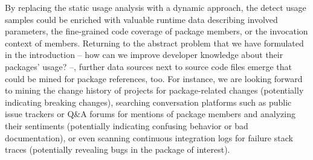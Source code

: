 By replacing the static usage analysis with a dynamic approach, the detect usage samples could be enriched with valuable runtime data describing involved parameters, the fine-grained code coverage of package members, or the invocation context of members.
Returning to the abstract problem that we have formulated in the introduction -- how can we improve developer knowledge about their packages' usage? --, further data sources next to source code files emerge that could be mined for package references, too.
For instance, we are looking forward to mining the change history of projects for package-related changes (potentially indicating breaking changes), searching conversation platforms such as public issue trackers or Q\&A forums for mentions of package members and analyzing their sentiments (potentially indicating confusing behavior or bad documentation), or even scanning continuous integration logs for failure stack traces (potentially revealing bugs in the package of interest).
